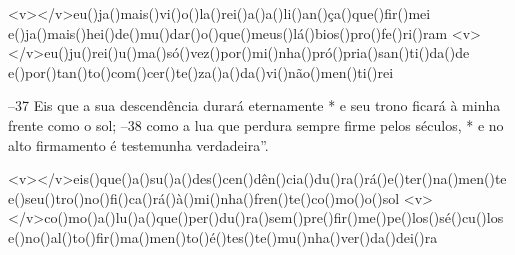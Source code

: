 <v></v>eu()ja()mais()vi()o()la()rei()a()a()li()an()ça()que()fir()mei
e()ja()mais()hei()de()mu()dar()o()que()meus()lá()bios()pro()fe()ri()ram
<v></v>eu()ju()rei()u()ma()só()vez()por()mi()nha()pró()pria()san()ti()da()de
e()por()tan()to()com()cer()te()za()a()da()vi()não()men()ti()rei

–37 Eis que a sua descendência durará eternamente *
e seu trono ficará à minha frente como o sol; 
–38 como a lua que perdura sempre firme pelos séculos, *
e no alto firmamento é testemunha verdadeira”.

<v></v>eis()que()a()su()a()des()cen()dên()cia()du()ra()rá()e()ter()na()men()te
e()seu()tro()no()fi()ca()rá()à()mi()nha()fren()te()co()mo()o()sol
<v></v>co()mo()a()lu()a()que()per()du()ra()sem()pre()fir()me()pe()los()sé()cu()los
e()no()al()to()fir()ma()men()to()é()tes()te()mu()nha()ver()da()dei()ra